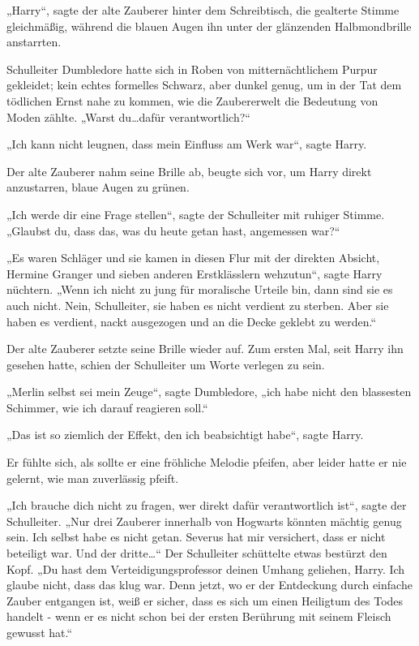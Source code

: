 {„Harry“, sagte der alte Zauberer hinter dem Schreibtisch, die gealterte Stimme gleichmäßig, während die blauen Augen ihn unter der glänzenden Halbmondbrille anstarrten.

Schulleiter Dumbledore hatte sich in Roben von mitternächtlichem Purpur gekleidet; kein echtes formelles Schwarz, aber dunkel genug, um in der Tat dem tödlichen Ernst nahe zu kommen, wie die Zaubererwelt die Bedeutung von Moden zählte. „Warst du…dafür verantwortlich?“

„Ich kann nicht leugnen, dass mein Einfluss am Werk war“, sagte Harry.

Der alte Zauberer nahm seine Brille ab, beugte sich vor, um Harry direkt anzustarren, blaue Augen zu grünen.

„Ich werde dir eine Frage stellen“, sagte der Schulleiter mit ruhiger Stimme. „Glaubst du, dass das, was du heute getan hast, angemessen war?“

„Es waren Schläger und sie kamen in diesen Flur mit der direkten Absicht, Hermine Granger und sieben anderen Erstklässlern wehzutun“, sagte Harry nüchtern. „Wenn ich nicht zu jung für moralische Urteile bin, dann sind sie es auch nicht. Nein, Schulleiter, sie haben es nicht verdient zu sterben. Aber sie haben es verdient, nackt ausgezogen und an die Decke geklebt zu werden.“

Der alte Zauberer setzte seine Brille wieder auf. Zum ersten Mal, seit Harry ihn gesehen hatte, schien der Schulleiter um Worte verlegen zu sein.

„Merlin selbst sei mein Zeuge“, sagte Dumbledore, „ich habe nicht den blassesten Schimmer, wie ich darauf reagieren soll.“

„Das ist so ziemlich der Effekt, den ich beabsichtigt habe“, sagte Harry.

Er fühlte sich, als sollte er eine fröhliche Melodie pfeifen, aber leider hatte er nie gelernt, wie man zuverlässig pfeift.

„Ich brauche dich nicht zu fragen, wer direkt dafür verantwortlich ist“, sagte der Schulleiter. „Nur drei Zauberer innerhalb von Hogwarts könnten mächtig genug sein. Ich selbst habe es nicht getan. Severus hat mir versichert, dass er nicht beteiligt war. Und der dritte…“ Der Schulleiter schüttelte etwas bestürzt den Kopf. „Du hast dem Verteidigungsprofessor deinen Umhang geliehen, Harry. Ich glaube nicht, dass das klug war. Denn jetzt, wo er der Entdeckung durch einfache Zauber entgangen ist, weiß er sicher, dass es sich um einen Heiligtum des Todes handelt - wenn er es nicht schon bei der ersten Berührung mit seinem Fleisch gewusst hat.“

}
